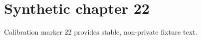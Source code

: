\chapter{Synthetic chapter 22}\label{chap:22}
Calibration marker 22 provides stable, non-private fixture text.
